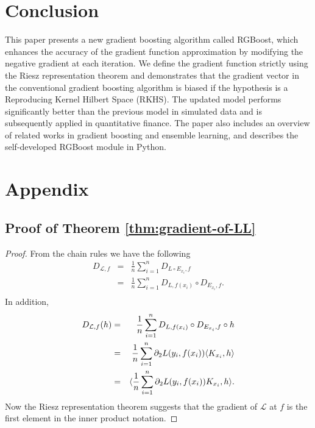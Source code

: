\section{Conclusion}

This paper presents a new gradient boosting algorithm called RGBoost, which enhances the accuracy of the gradient function approximation by modifying the negative gradient at each iteration. We define the gradient function strictly using the Riesz representation theorem and demonstrates that the gradient vector in the conventional gradient boosting algorithm is biased if the hypothesis is a Reproducing Kernel Hilbert Space (RKHS). The updated model performs significantly better than the previous model in simulated data and is subsequently applied in quantitative finance. The paper also includes an overview of related works in gradient boosting and ensemble learning, and describes the self-developed RGBoost module in Python.

\appendix
\newpage

\section{Appendix}

\subsection{Proof of Theorem \ref{thm:gradient-of-LL}}
\begin{proof}
From the chain rules we have the following
\begin{eqnarray*}
	D_{\mathcal{L},f} &=& \frac{1}{n}\sum_{i=1}^n D_{L \circ E_{x_i},f} \\
	&=& \frac{1}{n}\sum_{i=1}^n D_{L,f(x_i)} \circ D_{E_{x_i},f}. \\
\end{eqnarray*} 
In addition,
\begin{eqnarray*}
	D_{\mathcal{L},f}(h) &=& \frac{1}{n}\sum_{i=1}^n D_{L,f(x_i)} \circ D_{E_{x_i},f} \circ h \\
	&=& \frac{1}{n} \sum_{i=1}^{n} \partial_2 L(y_i,f(x_i)) {\langle K_{x_i},h\rangle} \\
	&=& {\langle \frac{1}{n} \sum_{i=1}^{n} \partial_2 L(y_i,f(x_i)) K_{x_i},h\rangle}.
\end{eqnarray*}
Now the Riesz representation theorem suggests that the gradient of $\mathcal{L}$ at $f$ is the first element in the inner product notation.
\end{proof}
